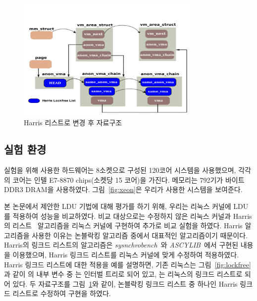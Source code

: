  \begin{figure}[h]
    \centering
    \includegraphics[width=0.8\textwidth]{fig/lockfree_2}
    \caption{Harris 리스트로 변경 후 자료구조}
  \label{fig:lockfree_2}
\end{figure}

\subsection{실험 환경}

실험을 위해 사용한 하드웨어는 8소켓으로 구성된 120코어 시스템을 사용했으며,
각각의 코어는 인텔 E7-8870 chips(소켓당 15 코어)을 가진다.
메모리는 792기가 바이트 DDR3 DRAM을 사용하였다.
그림~\ref{fig:xeon}은 우리가 사용한 시스템을 보여준다.

본 논문에서 제안한 LDU 기법에 대해 평가를 하기 위해, 우리는 리눅스 커널에 LDU를 적용하여 성능을 비교하였다.
비교 대상으로는 수정하지 않은 리눅스 커널과 Harris의  리스트~\cite{Harris2001Lockfree}
알고리즘을 리눅스 커널에 구현하여 추가로 비교 실험을 하였다.
Harris 알고리즘을 사용한 이유는 논블락킹 알고리즘 중에서 대표적인 알고리즘이기 때문이다. 
Harris의 링크드 리스트의 알고리즘은
\textit{sysnchrobench}~\cite{Gramoli2015Synchrobench}와
\textit{ASCYLIB}~\cite{David2015ASYNCHRONIZED}에서 구현된 내용을 이용했으며, Harris 링크드 
리스트를 리눅스 커널에 맞게 수정하여 적용하였다.
Harris 링크드 리스트에 대한 적용을 예를 설명하면, 기존 리눅스는 그림~\ref{fig:lockfree}과 같이 
의 내부 변수 중 는 인터벌 트리로 되어 있고, 
는 리눅스의 링크드 리스트로 되어 있다. 
두 자료구조를 그림~\ref{fig:lockfree_2}와 같이, 
논블락킹 링크드 리스트 중 하나인 Harris 링크드 리스트로 수정하여 구현을 하였다.


